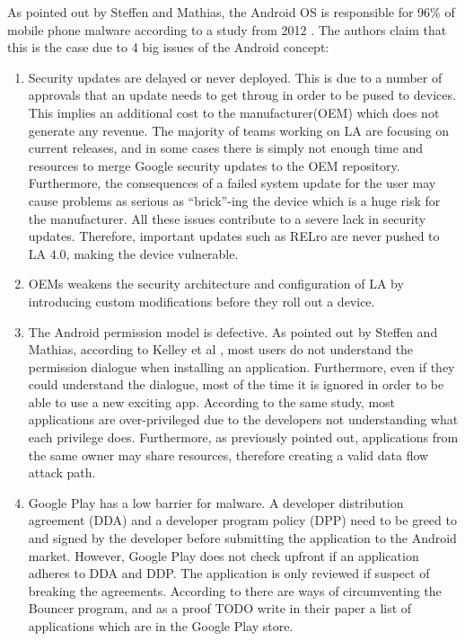 As pointed out by Steffen and Mathias, the Android OS is responsible for 96\% of mobile phone malware according to a study from 2012 \cite{}. The authors claim that this is the case due to 4 big issues of the Android concept:
\begin{enumerate}
	\item Security updates are delayed or never deployed. This is due to a number of approvals that an update needs to get throug in order to be pused to devices. This implies an additional cost to the manufacturer(OEM) which does not generate any revenue. The majority of teams working on LA are focusing on current releases, and in some cases there is simply not enough time and resources to merge Google security updates to the OEM repository. Furthermore, the consequences of a failed system update for the user may cause problems as serious as ``brick''-ing the device which is a huge risk for the manufacturer. All these issues contribute to a severe lack in security updates. Therefore, important updates such as RELro are never pushed to LA 4.0, making the device vulnerable.
	
	\item OEMs weakens the security architecture and configuration of LA by introducing custom modifications before they roll out a device.
	
	\item The Android permission model is defective. As pointed out by Steffen and Mathias, according to Kelley et al \cite{}, most users do not understand the permission dialogue when installing an application. Furthermore, even if they could understand the dialogue, most of the time it is ignored in order to be able to use a new exciting app. According to the same study, most applications are over-privileged due to the developers not understanding what each privilege does. Furthermore, as previously pointed out, applications from the same owner may share resources, therefore creating a valid data flow attack path. 
	
	\item Google Play has a low barrier for malware. A developer distribution agreement (DDA) and a developer program policy (DPP) need to be greed to and signed by the developer before submitting the application to the Android market. However, Google Play does not check upfront if an application adheres to DDA and DDP. The application is only reviewed if suspect of breaking the agreements. According to \cite{} there are ways of circumventing the Bouncer program, and as a proof TODO write in their paper \cite{} a list of applications which are in the Google Play store.
\end{enumerate}

